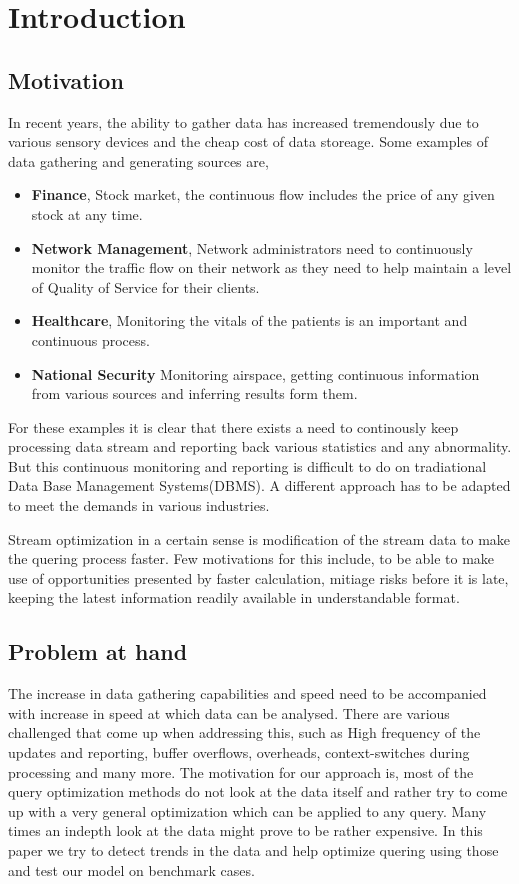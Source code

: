\chapter{Introduction}
\label{chapter:Introduction}
\thispagestyle{myheadings}

\section{Motivation}
\label{sec:Motivation}
In recent years, the ability to gather data has increased tremendously due to various sensory devices and the cheap cost of data storeage. Some examples of data gathering and generating sources are,
\begin{itemize}
\item \textbf{Finance}, Stock market, the continuous flow includes the price of any given stock at any time. 
\item \textbf{Network Management}, Network administrators need to continuously monitor the traffic flow on their network as they need to help maintain a level of Quality of Service for their clients.
\item \textbf{Healthcare}, Monitoring the vitals of the patients is an important and continuous process. 
\item \textbf{National Security} Monitoring airspace, getting continuous information from various sources and inferring results form them.
\end{itemize} 
For these examples it is clear that there exists a need to continously keep processing data stream and reporting back various statistics and any abnormality. But this continuous monitoring and reporting is difficult to do on tradiational Data Base Management Systems(DBMS). A different approach has to be adapted to meet the demands in various industries.
\par Stream optimization in a certain sense is modification of the stream data to make the quering process faster. Few motivations for this include, to be able to make use of opportunities presented by faster calculation, mitiage risks before it is late, keeping the latest information readily available in understandable format.

\section{Problem at hand}
\label{sec:Problem at hand}
\par The increase in data gathering capabilities and speed need to be accompanied with increase in speed at which data can be analysed. There are various challenged that come up when addressing this, such as High frequency of the updates and reporting, buffer overflows, overheads, context-switches during processing and many more. The motivation for our approach is, most of the query optimization methods do not look at the data itself and rather try to come up with a very general optimization which can be applied to any query. Many times an indepth look at the data might prove to be rather expensive. In this paper we try to detect trends in the data and help optimize quering using those and test our model on benchmark cases.

